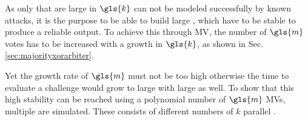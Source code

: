 As only \xpufs that are large in $\gls{k}$ can not be modeled successfully by known attacks, it is the purpose to be able to build large \xpufs, which have to be stable to produce a reliable output. %
To achieve this through \ac{MV}, the number of $\gls{m}$ votes has to be increased with a growth in $\gls{k}$, as shown in Sec. \ref{sec:majorityxorarbiter}.

Yet the growth rate of $\gls{m}$ must not be too high otherwise the time to evaluate a challenge would grow to large with large \xpufs as well. %
To show that this high stability can be reached using a polynomial number of $\gls{m}$ \acp{MV}, multiple \mxpufs are simulated.
These \mxpufs consists of different numbers of $k$ parallel \mpufs.


